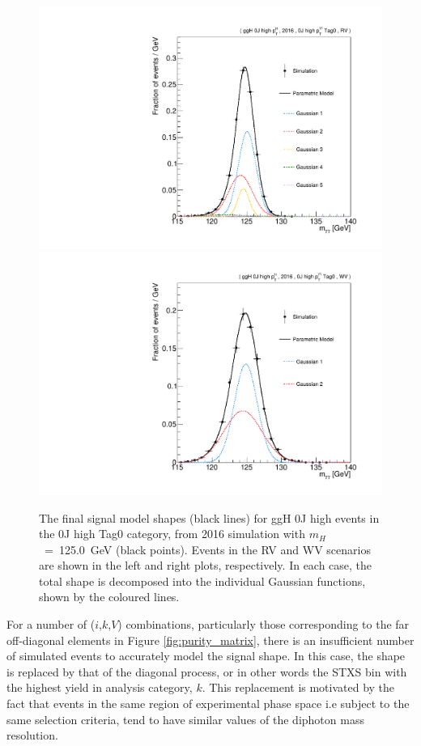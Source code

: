 \begin{figure}
  \centering
  \includegraphics[width=.49\textwidth]{Figures/hgg_stats/RV_shape_pdf_components_GG2H_0J_PTH_GT10_RECO_0J_PTH_GT10_Tag0.pdf}
  \hfill
  \includegraphics[width=.49\textwidth]{Figures/hgg_stats/WV_shape_pdf_components_GG2H_0J_PTH_GT10_RECO_0J_PTH_GT10_Tag0.pdf}
  \caption[Signal modelling: components]
  {
    The final signal model shapes (black lines) for ggH 0J high \ptH events in the 0J high \ptgg Tag0 category, from 2016 simulation with $m_H$~=~125.0~GeV (black points). Events in the RV and WV scenarios are shown in the left and right plots, respectively. In each case, the total shape is decomposed into the individual Gaussian functions, shown by the coloured lines.
  }
  \label{fig:signal_fitting}
\end{figure}

For a number of ($i$,$k$,$V$) combinations, particularly those corresponding to the far off-diagonal elements in Figure \ref{fig:purity_matrix}, there is an insufficient number of simulated events to accurately model the signal shape. In this case, the shape is replaced by that of the diagonal process, or in other words the STXS bin with the highest yield in analysis category, $k$. This replacement is motivated by the fact that events in the same region of experimental phase space i.e subject to the same selection criteria, tend to have similar values of the diphoton mass resolution.

